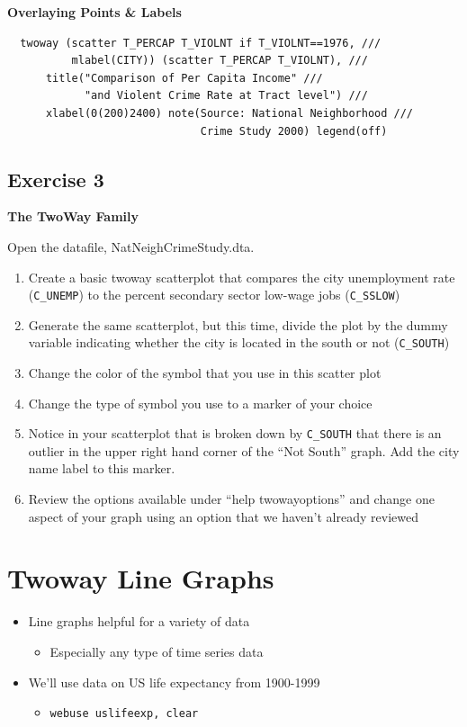 \documentclass[]{book}
\providecommand{\tightlist}{%
  \setlength{\itemsep}{0pt}\setlength{\parskip}{0pt}}
\begin{document}
\textbf{Overlaying Points \& Labels}

\begin{verbatim}
  twoway (scatter T_PERCAP T_VIOLNT if T_VIOLNT==1976, ///
          mlabel(CITY)) (scatter T_PERCAP T_VIOLNT), ///
      title("Comparison of Per Capita Income" ///
            "and Violent Crime Rate at Tract level") ///
      xlabel(0(200)2400) note(Source: National Neighborhood ///
                              Crime Study 2000) legend(off)
\end{verbatim}

\subsection{Exercise 3}\label{exercise-3-5}

\textbf{The TwoWay Family}

Open the datafile, NatNeighCrimeStudy.dta.

\begin{enumerate}
\def\labelenumi{\arabic{enumi}.}
\tightlist
\item
  Create a basic twoway scatterplot that compares the city unemployment
  rate (\texttt{C\_UNEMP}) to the percent secondary sector low-wage jobs
  (\texttt{C\_SSLOW})
\item
  Generate the same scatterplot, but this time, divide the plot by the
  dummy variable indicating whether the city is located in the south or
  not (\texttt{C\_SOUTH})
\item
  Change the color of the symbol that you use in this scatter plot
\item
  Change the type of symbol you use to a marker of your choice
\item
  Notice in your scatterplot that is broken down by \texttt{C\_SOUTH}
  that there is an outlier in the upper right hand corner of the ``Not
  South'' graph. Add the city name label to this marker.
\item
  Review the options available under ``help twowayoptions'' and change
  one aspect of your graph using an option that we haven't already
  reviewed
\end{enumerate}

\section{Twoway Line Graphs}\label{twoway-line-graphs}

\begin{itemize}
\tightlist
\item
  Line graphs helpful for a variety of data

  \begin{itemize}
  \tightlist
  \item
    Especially any type of time series data
  \end{itemize}
\item
  We'll use data on US life expectancy from 1900-1999

  \begin{itemize}
  \tightlist
  \item
    \texttt{webuse\ uslifeexp,\ clear}
  \end{itemize}
\end{itemize}
\end{document}

